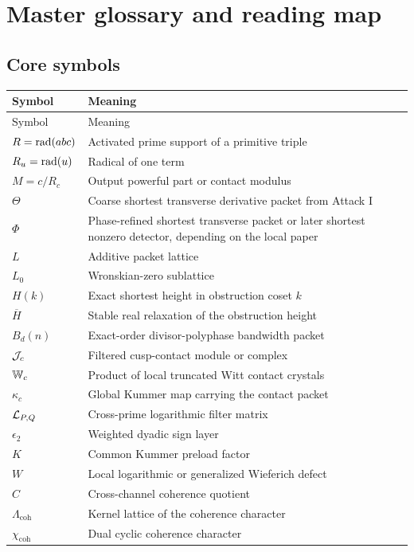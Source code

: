 \chapter{Master glossary and reading map}

\section{Core symbols}
\begin{longtable}{L{0.18\textwidth}L{0.72\textwidth}}
\toprule
Symbol & Meaning\\
\midrule
\endfirsthead
\toprule
Symbol & Meaning\\
\midrule
\endhead
$R=\operatorname{rad}(abc)$ & Activated prime support of a primitive triple\\
$R_u=\operatorname{rad}(u)$ & Radical of one term\\
$M=c/R_c$ & Output powerful part or contact modulus\\
$\Theta$ & Coarse shortest transverse derivative packet from Attack I\\
$\Phi$ & Phase-refined shortest transverse packet or later shortest nonzero detector, depending on the local paper\\
$L$ & Additive packet lattice\\
$L_0$ & Wronskian-zero sublattice\\
$H(k)$ & Exact shortest height in obstruction coset $k$\\
$\overline H$ & Stable real relaxation of the obstruction height\\
$B_d(n)$ & Exact-order divisor-polyphase bandwidth packet\\
$\mathcal J_c$ & Filtered cusp-contact module or complex\\
$\mathbb W_c$ & Product of local truncated Witt contact crystals\\
$\kappa_c$ & Global Kummer map carrying the contact packet\\
$\mathcal L_{P,Q}$ & Cross-prime logarithmic filter matrix\\
$\epsilon_2$ & Weighted dyadic sign layer\\
$K$ & Common Kummer preload factor\\
$W$ & Local logarithmic or generalized Wieferich defect\\
$C$ & Cross-channel coherence quotient\\
$\Lambda_{\mathrm{coh}}$ & Kernel lattice of the coherence character\\
$\chi_{\mathrm{coh}}$ & Dual cyclic coherence character\\
\bottomrule
\end{longtable}


